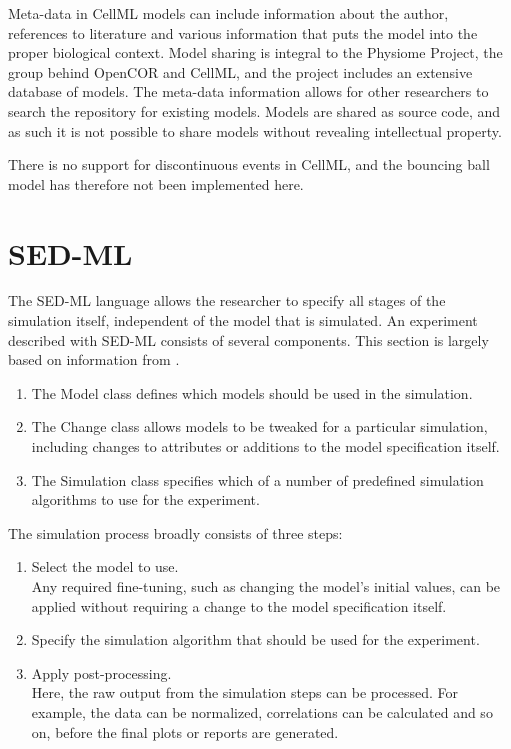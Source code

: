 \documentclass[\rootfolder/main.tex]{subfiles}
\begin{document}
Meta-data in CellML models can include information about the author, references to literature and various information that puts the model into the proper biological context.
Model sharing is integral to the Physiome Project, the group behind OpenCOR and CellML, and the project includes an extensive database of models.
The meta-data information allows for other researchers to search the repository for existing models.
Models are shared as source code, and as such it is not possible to share models without revealing intellectual property.

There is no support for discontinuous events in CellML, and the bouncing ball model has therefore not been implemented here.

\section{SED-ML}

The SED-ML language allows the researcher to specify all stages of the simulation itself, independent of the model that is simulated.
An experiment described with SED-ML consists of several components.
This section is largely based on information from \cite{sedml-specification}.

\begin{enumerate}
    \item The Model class defines which models should be used in the simulation.
    \item The Change class allows models to be tweaked for a particular simulation, including changes to attributes or additions to the model specification itself.
    \item The Simulation class specifies which of a number of predefined simulation algorithms to use for the experiment.
\end{enumerate}

The simulation process broadly consists of three steps:

\begin{enumerate}
    \item Select the model to use.\\
        Any required fine-tuning, such as changing the model's initial values, can be applied without requiring a change to the model specification itself.
    \item Specify the simulation algorithm that should be used for the experiment.
    \item Apply post-processing.\\
        Here, the raw output from the simulation steps can be processed. For example, the data can be normalized,
        correlations can be calculated and so on, before the final plots or reports are generated.
\end{enumerate}
\end{document}
